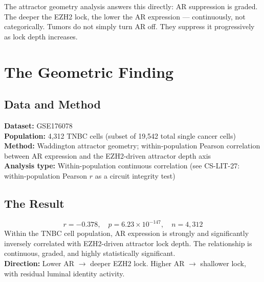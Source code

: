 \documentclass[12pt, a4paper]{article}
\begin{document}
The attractor geometry analysis answers this
directly: AR suppression is graded. The deeper
the EZH2 lock, the lower the AR expression ---
continuously, not categorically. Tumors do not
simply turn AR off. They suppress it
progressively as lock depth increases.

\section{The Geometric Finding}

\subsection{Data and Method}

\begin{center}
\colorbox{repobox}{
\begin{minipage}{0.82\textwidth}
\vspace{0.4em}
\textbf{Dataset:} GSE176078\\
\textbf{Population:} 4,312 TNBC cells (subset
of 19,542 total single cancer cells)\\
\textbf{Method:} Waddington attractor geometry;
within-population Pearson correlation between
AR expression and the EZH2-driven attractor
depth axis\\
\textbf{Analysis type:} Within-population
continuous correlation (see CS-LIT-27:
within-population Pearson $r$ as a circuit
integrity test)
\vspace{0.4em}
\end{minipage}}
\end{center}

\vspace{0.5em}

\subsection{The Result}

\begin{center}
\colorbox{findingbox}{
\begin{minipage}{0.88\textwidth}
\vspace{0.6em}
\[
r = -0.378,\quad
p = 6.23 \times 10^{-147},\quad
n = 4{,}312
\]
\vspace{0.3em}
Within the TNBC cell population, AR expression
is strongly and significantly inversely
correlated with EZH2-driven attractor lock depth.
The relationship is continuous, graded, and
highly statistically significant.\\[0.4em]
\textbf{Direction:} Lower AR $\rightarrow$
deeper EZH2 lock.
Higher AR $\rightarrow$ shallower lock,
with residual luminal identity activity.
\vspace{0.5em}
\end{minipage}}
\end{center}
\end{document}
